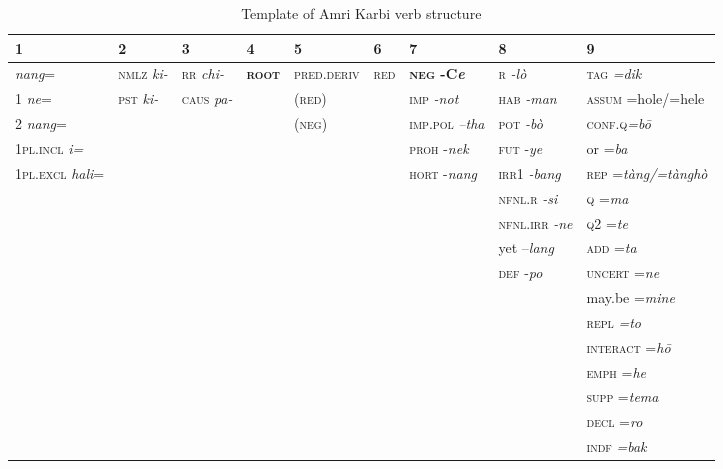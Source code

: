 \documentclass[output=paper,colorlinks,citecolor=brown]{langscibook}
\begin{document}
\begin{table}
\begin{tabularx}{\textwidth}{l@{}l|l|l|l|l|l|l|l}
{1} & {2} & {3} & {4} & {5} & {6} & {7} & {8} & {9}\\
\midrule 
{ \textit{nang}=} & \textsc{nmlz} \textit{ki-} & \textsc{rr} \textit{chi-} & \bfseries\scshape root & \textsc{pred}.\textsc{deriv} & \textsc{red} & {\textbf{\textsc{neg} \textbf{-C}}\textbf{\textit{e}}} & {\textsc{r} \textit{{}-lò}} & {\textsc{tag} \textit{=dik}}\\

{1 \textit{ne}=} & \textsc{pst} \textit{ki-} & \textsc{caus} \textit{pa-} & & \scshape (red) & & \textsc{imp} \textit{{}-not} & {\textsc{hab} \textit{{}-man}} & {\textsc{assum} =hole/=hele}\\

{2 \textit{nang}=} & & & & \textsc{(neg)} & & \textsc{imp}.\textsc{pol} \textit{–tha} & {\textsc{pot} \textit{{}-bò}} & {\textsc{conf}.\textsc{q}\textit{=bō}}\\

{\textsc{1pl}.\textsc{incl} \textit{i=}} & & & & & &\textsc{proh} {}-\textit{nek} & {\textsc{fut} {}-\textit{ye}} & {or =\textit{ba}}\\

{\textsc{1pl}.\textsc{excl} \textit{hali}=} & & & & & &\textsc{hort} \textsc{{}-}\textit{nang} & {\textsc{irr1} \textit{{}-bang}} & {\textsc{rep} \textsc{=}\textit{tàng/=tànghò}}\\

&&&&&&& {\textsc{nfnl}.\textsc{r} \textit{{}-si}} & {\textsc{q} =\textit{ma}}\\
&&&&&&& {\textsc{nfnl}.\textsc{irr} \textit{{}-ne}}& {\textsc{q2} =\textit{te}}\\
&&&&&&& {yet –\textit{lang}}& {\textsc{add} =\textit{ta}}\\
&&&&&&& {\textsc{def} {}-\textit{po}} & {\textsc{uncert} =\textit{ne}}\\
&&&&&&&& {may.be =\textit{mine}}\\
&&&&&&&& {\textsc{repl} \textit{=to}}\\
&&&&&&&& {\textsc{interact} =\textit{hō}}\\
&&&&&&&& {\textsc{emph} =\textit{he}}\\
&&&&&&&& {\textsc{supp} =\textit{tema}}\\
&&&&&&&& {\textsc{decl} =\textit{ro}}\\
&&&&&&&& {\textsc{indf} \textit{=bak}}\\
\end{tabularx}
\caption{Template of Amri Karbi verb structure}
\label{tab:amr:1}
\end{table}
\end{document}
